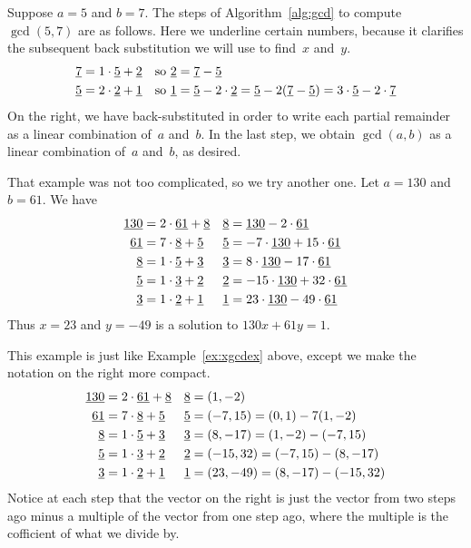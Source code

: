 \begin{example}
  Suppose $a=5$ and $b=7$.  The steps of Algorithm~\ref{alg:gcd} to
  compute $\gcd(5,7)$ are as follows.  Here we underline certain
  numbers, because it clarifies the subsequent back substitution we
  will use to find~$x$ and~$y$.
\begin{align*}
 \ul{7}&=1\cdot \ul{5} + \underline{2} & \text{so } \ul{2} &= \ul{7} - \ul{5}\hfill\\
 \ul{5}&=2\cdot \ul{2} + \ul{1}    & \text{so }     \ul{1}&= \ul{5} - 2\cdot \ul{2} = \ul{5} - 2(\ul{7}-\ul{5}) = 3\cdot\ul{5}-2\cdot\ul{7}\hfill
\end{align*}
On the right, we have back-substituted in order to write each partial
remainder as a linear combination of~$a$ and~$b$.  In the last step,
we obtain $\gcd(a,b)$ as a linear combination of~$a$ and~$b$, as
desired.
\end{example}

\begin{example}\label{ex:xgcdex}
That example was not too complicated, so we try another one.
Let $a=130$ and $b=61$.  We have
\begin{align*}
\underline{130} &= 2\cdot \underline{61} + \underline{8} &  \underline{8} &= \underline{130}-2\cdot\underline{61}\\
 \underline{61} &= 7\cdot \underline{8} + \underline{5}   & \underline{5} &= -7\cdot\underline{130}+15\cdot\underline{61}\\
  \underline{8} &= 1\cdot \underline{5} + \underline{3}    & \underline{3} &= 8\cdot\underline{130}-17\cdot\underline{61}\\
  \underline{5} &= 1\cdot \underline{3} + \underline{2}    & \underline{2} &=-15\cdot\underline{130}+32\cdot\underline{61}\\
  \underline{3} &= 1\cdot \underline{2} + \underline{1}&  \underline{1} &= 23\cdot\underline{130}-49\cdot\underline{61}
\end{align*}
Thus $x=23$ and $y=-49$ is a solution to $130 x + 61 y = 1$.
\end{example}

\begin{example}\label{ex:xgcdex1}
This example is just like Example~\ref{ex:xgcdex} above,
except we make the notation on the right more compact.
\begin{align*}
\underline{130} &= 2\cdot \underline{61} + \underline{8} &  \underline{8} &= (1,-2)\\
 \underline{61} &= 7\cdot \underline{8} + \underline{5}   & \underline{5} &= (-7,15) = (0,1) - 7(1,-2)\\
  \underline{8} &= 1\cdot \underline{5} + \underline{3}    & \underline{3} &= (8,-17) = (1,-2) - (-7,15)\\
  \underline{5} &= 1\cdot \underline{3} + \underline{2}    & \underline{2} &= (-15,32) = (-7,15) - (8,-17)\\
  \underline{3} &= 1\cdot \underline{2} + \underline{1}&  \underline{1} &= (23,-49) = (8,-17) - (-15,32)
\end{align*}
Notice at each step that the vector on the right is just the vector from
two steps ago minus a multiple of the vector from one step ago, where
the multiple is the cofficient of what we divide by.
\end{example}



